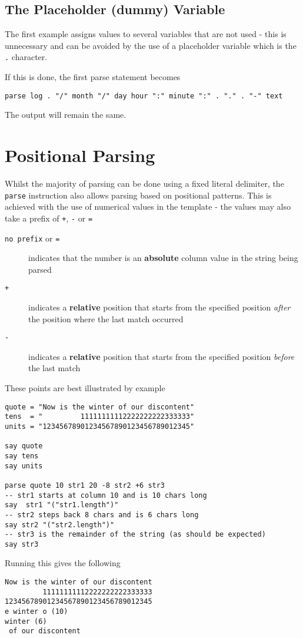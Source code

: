 {\subsection{The Placeholder (dummy) Variable}
The first example assigns values to several variables that are not used - this is unnecessary and can be avoided by the use of a placeholder variable which is the \texttt{.} character.

If this is done, the first parse statement becomes
\begin{verbatim}
parse log . "/" month "/" day hour ":" minute ":" . "." . "-" text
\end{verbatim}
The output will remain the same.

\section{Positional Parsing}

Whilst the majority of parsing can be done using a fixed literal delimiter, the \texttt{parse} instruction also allows parsing based on positional patterns. This is achieved with the use of numerical values in the template - the values may also take a prefix of \texttt{+}, \texttt{-} or \texttt{=}

\begin{description}
\item[\texttt{no prefix} or \texttt{=}] indicates that the number is an \textbf{absolute} column value in the string being parsed
\item[\texttt{+}] indicates a \textbf{relative} position that starts from the specified position \textit{after} the position where the last match occurred
\item[\texttt{-}] indicates a \textbf{relative} position that starts from the specified position \textit{before} the last match
\end{description}

These points are best illustrated by example
\begin{lstlisting}[label=positionalParsing, caption=Positional Parsing]
quote = "Now is the winter of our discontent"
tens  = "         11111111112222222222333333"
units = "12345678901234567890123456789012345"

say quote
say tens
say units

parse quote 10 str1 20 -8 str2 +6 str3
-- str1 starts at column 10 and is 10 chars long
say  str1 "("str1.length")"
-- str2 steps back 8 chars and is 6 chars long
say str2 "("str2.length")"
-- str3 is the remainder of the string (as should be expected)
say str3
\end{lstlisting}
Running this gives the following
\begin{verbatim}
Now is the winter of our discontent 
         11111111112222222222333333 
12345678901234567890123456789012345 
e winter o (10) 
winter (6) 
 of our discontent 
\end{verbatim}

}
